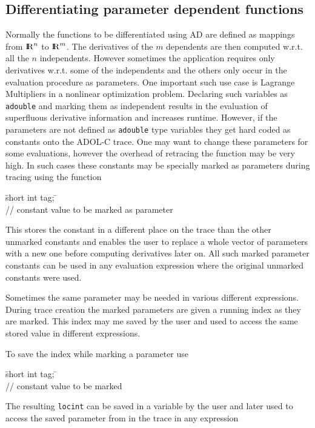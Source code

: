 \documentclass[11pt,twoside]{article}
\newcommand{\R}{{ {\rm I} \kern -.225em {\rm R} }}
\begin{document}
\subsection{Differentiating parameter dependent functions}
%
Normally the functions to be differentiated using AD are defined as
mappings from $\R^n$ to $\R^m$. The derivatives of the $m$ dependents
are then computed w.r.t. all the $n$ independents. However sometimes
the application requires only derivatives w.r.t. some of the
independents and the others only occur in the evaluation procedure as
parameters. One important such use case is Lagrange Multipliers in a
nonlinear optimization problem. Declaring such variables as
\verb=adouble= and marking them as independent results in the
evaluation of superfluous derivative information and increases
runtime. However, if the parameters are not defined as \verb=adouble=
type variables they get hard coded as constants onto the ADOL-C
trace. One may want to change these parameters for some evaluations,
however the overhead of retracing the function may be very high. In
such cases these constants may be specially marked as parameters
during tracing using the function 
\begin{tabbing}
\hspace{0.5in}\={\sf short int tag;} \hspace{1.1in}\= \kill    %
\\
         \> // constant value to be marked as parameter \\
\end{tabbing}
This stores the constant in a different place on the trace than the
other unmarked constants and enables the user to replace a whole
vector of parameters with a new one before computing derivatives later
on. All such marked parameter constants can be used in any evaluation
expression where the original unmarked constants were used.

Sometimes the same parameter may be needed in various different
expressions. During trace creation the marked parameters are given a
running index as they are marked. This index may me saved by the user
and used to access the same stored value in different expressions.

To save the index while marking a parameter use
\begin{tabbing}
\hspace{0.5in}\={\sf short int tag;} \hspace{1.1in}\= \kill    %
\\
 \> // constant value to be marked
\end{tabbing}
The resulting \verb=locint= can be saved in a variable by the user and
later used to access the saved parameter from in the trace in any expression
\end{document}
